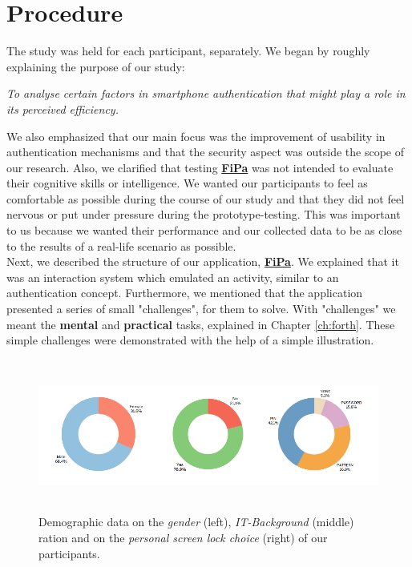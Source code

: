 \section{Procedure} \label{5.3}
The study was held for each participant, separately. We began by roughly explaining the purpose of our study:

\begin{center}
\textit{To analyse certain factors in smartphone authentication that might play a role in its perceived efficiency.}    
\end{center}

We also emphasized that our main focus was the improvement of usability in authentication mechanisms and that the security aspect was outside the scope of our research. Also, we clarified that testing \underline{\textbf{FiPa}} was not intended to evaluate their cognitive skills or intelligence. We wanted our participants to feel as comfortable as possible during the course of our study and that they did not feel nervous or put under pressure during the prototype-testing. This was important to us because we wanted their performance and our collected data to be as close to the results of a real-life scenario as possible. \\

Next, we described the structure of our application, \underline{\textbf{FiPa}}. We explained that it was an interaction system which emulated an activity, similar to an authentication concept. Furthermore, we mentioned that the application presented a series of small "challenges", for them to solve. With "challenges" we meant the \textbf{mental} and \textbf{practical} tasks, explained in Chapter \ref{ch:forth}. These simple challenges were demonstrated with the help of a simple illustration.\\

\begin{figure}[t!]
\centering
\includegraphics[width=15cm, height=5cm]{Chapters/graphics/Demos.PNG}
\caption{Demographic data on the \textit{gender} (left), \textit{IT-Background} (middle) ration and on the \textit{personal screen lock choice} (right) of our participants.}
\label{fig:demo}
\end{figure}

